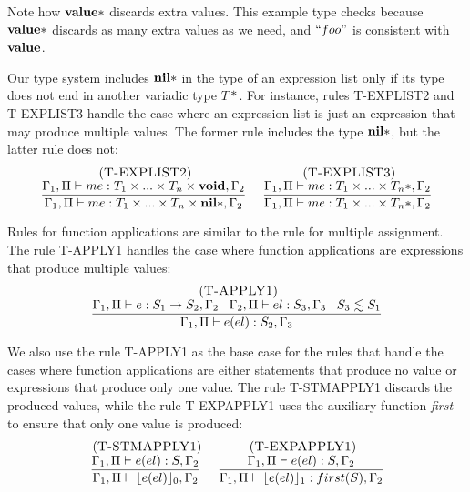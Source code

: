 Note how $\mathbf{value}{*}$ discards extra values.
This example type checks because $\mathbf{value}{*}$ discards as many extra
values as we need, and $``foo"$ is consistent with $\mathbf{value}$.

Our type system includes $\mathbf{nil}{*}$ in the type of an expression list only
if its type does not end in another variadic type $T{*}$.
For instance, rules \textsc{T-EXPLIST2} and \textsc{T-EXPLIST3} handle
the case where an expression list is just an expression that may produce
multiple values.
The former rule includes the type $\mathbf{nil}{*}$, but the latter rule does not:
\[
\begin{array}{c}
\begin{array}{c}
\; (\textsc{T-EXPLIST2})\\
\dfrac{\Gamma_{1}, \Pi \vdash me:T_{1} \times ... \times T_{n} \times \mathbf{void}, \Gamma_{2}}
      {\Gamma_{1}, \Pi \vdash me:T_{1} \times ... \times T_{n} \times \mathbf{nil}{*}, \Gamma_{2}}
\end{array}
\;
\begin{array}{c}
\; (\textsc{T-EXPLIST3})\\
\dfrac{\Gamma_{1}, \Pi \vdash me:T_{1} \times ... \times T_{n}{*}, \Gamma_{2}}
      {\Gamma_{1}, \Pi \vdash me:T_{1} \times ... \times T_{n}{*}, \Gamma_{2}}
\end{array}
\end{array}
\]

Rules for function applications are similar to the rule for multiple assignment.
The rule \textsc{T-APPLY1} handles the case where function applications
are expressions that produce multiple values:
\[
\begin{array}{c}
\; (\textsc{T-APPLY1})\\
\dfrac{\Gamma_{1}, \Pi \vdash e:S_{1} \rightarrow S_{2}, \Gamma_{2} \;\;\;
       \Gamma_{2}, \Pi \vdash el:S_{3}, \Gamma_{3} \;\;\;
       S_{3} \lesssim S_{1}}
      {\Gamma_{1}, \Pi \vdash e(el):S_{2}, \Gamma_{3}}
\end{array}
\]

We also use the rule \textsc{T-APPLY1} as the base case for the rules
that handle the cases where function applications are either statements
that produce no value or expressions that produce only one value.
The rule \textsc{T-STMAPPLY1} discards the produced values,
while the rule \textsc{T-EXPAPPLY1} uses the auxiliary function
\emph{first} to ensure that only one value is produced:
\[
\begin{array}{c}
\begin{array}{c}
\; (\textsc{T-STMAPPLY1})\\
\dfrac{\Gamma_{1}, \Pi \vdash e(el):S, \Gamma_{2}}
      {\Gamma_{1}, \Pi \vdash \lfloor e(el) \rfloor_{0},\Gamma_{2}}
\end{array}
\;
\begin{array}{c}
\; (\textsc{T-EXPAPPLY1})\\
\dfrac{\Gamma_{1}, \Pi \vdash e(el):S, \Gamma_{2}}
      {\Gamma_{1}, \Pi \vdash \lfloor e(el) \rfloor_{1}:first(S), \Gamma_{2}}
\end{array}
\end{array}
\]

